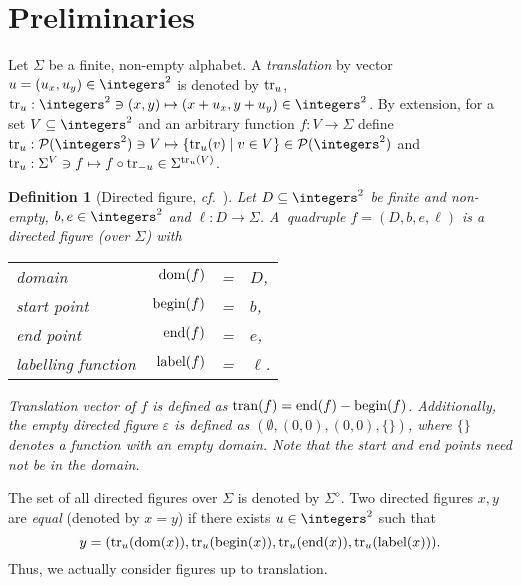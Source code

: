 \documentclass[final,nomarks]{dmtcs-episciences}
\newcommand{\e}{\varepsilon}
\newcommand{\dfplus}[1]{#1^{\diamond}}
\newcommand{\dfbegin}[1]{\mbox{\rm begin}(#1)}
\newcommand{\dfend}[1]{\mbox{\rm end}(#1)}
\newcommand{\dftransition}[1]{\mbox{\rm tran}(#1)}
\newcommand{\dflabel}[1]{\mbox{\rm label}(#1)}
\newcommand{\dfdomain}[1]{\mbox{\rm dom}(#1)}
\newtheorem{definition}{Definition}
\begin{document}
\section{Preliminaries}\label{sec:defs}

Let $\Sigma$ be a finite, non-empty alphabet. A
\emph{translation} by vector $u=(u_x,u_y)\in\integers^2$ is
denoted by $\mathrm{tr}_{u}$,
$\tr{u}:\integers^2\ni(x,y)\mapsto(x+u_x,y+u_y)\in\integers^2$.
By extension, for a set $V\subseteq\integers^2$ and an arbitrary
function $f:V\to\Sigma$ define
$\tr{u}:\mathcal{P}(\integers^2)\ni V \mapsto \{\tr{u}(v)\mid
v\in V\}\in \mathcal{P}(\integers^2)$ and $\mathrm{tr}_{u}:\Sigma^V\ni f
\mapsto f\circ \mathrm{tr}_{-u}\in \Sigma^{\mathrm{tr}_{u}(V)}$.



\begin{definition}[Directed figure, \textit{cf.}~\cite{KolMoc}]
Let $D\subseteq\integers^2$ be finite and non-empty, $b,e\in\integers^2$
and $\ell:D\to\Sigma$. A~quadruple $f=(D,b,e,\ell)$ is
a \emph{directed figure} (over $\Sigma$) with
\begin{center}
\begin{tabular}{lrcl}
\emph{domain}      & $\dfdomain{f}$ &=& $D$,\\
\emph{start point} & $\dfbegin{f}$  &=& $b$,\\
\emph{end point}   & $\dfend{f}$     &=& $e$,\\
\emph{labelling function} & $\dflabel{f}$ &=& $\ell$.
\end{tabular}
\end{center}
\emph{Translation vector} of $f$ is defined as
$\dftransition{f}=\dfend{f}-\dfbegin{f}$. Additionally, the \emph{empty
directed figure} $\e$ is defined as $(\emptyset,(0,0),(0,0),\{\})$,
where $\{\}$ denotes a function with an empty domain.
Note that the start and end points need not be in the domain.
\end{definition}


The set of all directed figures over $\Sigma$ is denoted by
$\dfplus{\Sigma}$. Two directed figures $x,y$ are \emph{equal} (denoted
by $x=y$) if there exists $u\in\integers^2$ such that
\begin{displaymath}
   y=(\tr{u}(\dfdomain{x}),\tr{u}(\dfbegin{x}),\tr{u}(\dfend{x}),\tr{u}(\dflabel{x})).
\end{displaymath}
Thus, we actually consider figures up to translation.
\end{document}
